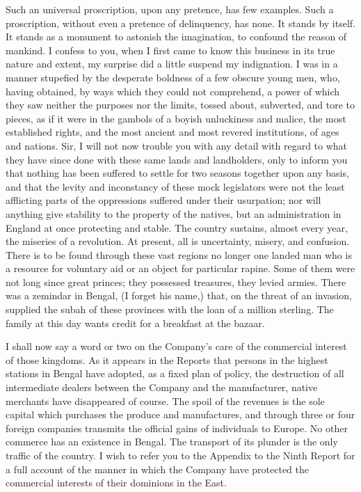 Such an universal proscription, upon any pretence, has few examples. Such a proscription, without even a pretence of delinquency, has none. It stands by itself. It stands as a monument to astonish the imagination, to confound the reason of mankind. I confess to you, when I first came to know this business in its true nature and extent, my surprise did a little suspend my indignation. I was in a manner stupefied by the desperate boldness of a few obscure young men, who, having obtained, by ways which they could not comprehend, a power of which they saw neither the purposes nor the limits, tossed about, subverted, and tore to pieces, as if it were in the gambols of a boyish unluckiness and malice, the most established rights, and the most ancient and most revered institutions, of ages and nations. Sir, I will not now trouble you with any detail with regard to what they have since done with these same lands and landholders, only to inform you that nothing has been suffered to settle for two seasons together upon any basis, and that the levity and inconstancy of these mock legislators were not the least afflicting parts of the oppressions suffered under their usurpation; nor will anything give stability to the property of the natives, but an administration in England at once protecting and stable. The country sustains, almost every year, the miseries of a revolution. At present, all is uncertainty, misery, and confusion. There is to be found through these vast regions no longer one landed man who is a resource for voluntary aid or an object for particular rapine. Some of them were not long since great princes; they possessed treasures, they levied armies. There was a zemindar in Bengal, (I forget his name,) that, on the threat of an invasion, supplied the subah of these provinces with the loan of a million sterling. The family at this day wants credit for a breakfast at the bazaar.

I shall now say a word or two on the Company's care of the commercial interest of those kingdoms. As it appears in the Reports that persons in the highest stations in Bengal have adopted, as a fixed plan of policy, the destruction of all intermediate dealers between the Company and the manufacturer, native merchants have disappeared of course. The spoil of the revenues is the sole capital which purchases the produce and manufactures, and through three or four foreign companies transmits the official gains of individuals to Europe. No other commerce has an existence in Bengal. The transport of its plunder is the only traffic of the country. I wish to refer you to the Appendix to the Ninth Report for a full account of the manner in which the Company have protected the commercial interests of their dominions in the East.

